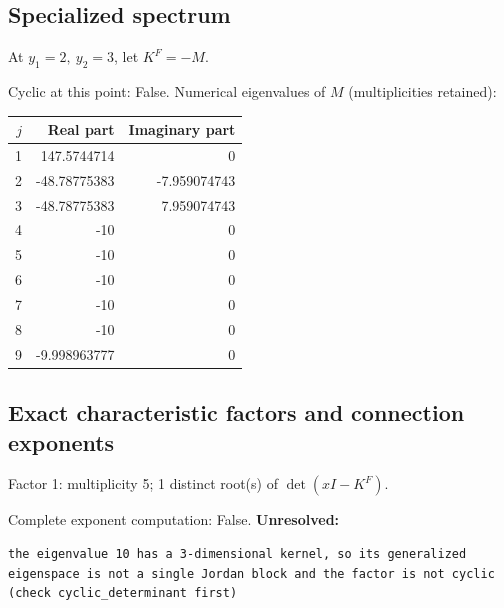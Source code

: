 \documentclass[10pt,a4paper]{article}
\newcommand{\fitmath}[1]{\sbox{\mathbox}{$\displaystyle #1$}\ifdim\wd\mathbox>\linewidth\resizebox{\linewidth}{!}{\usebox{\mathbox}}\else\usebox{\mathbox}\fi}
\begin{document}
\subsection*{Specialized spectrum}
At $y_1=2,\ y_2=3$, let $K^F=-M$.
\begin{center}\fitmath{\Delta=0}\end{center}
Cyclic at this point: False.
Numerical eigenvalues of $M$ (multiplicities retained):
\begin{center}\small\begin{tabular}{rrr}\toprule $j$ & Real part & Imaginary part\\\midrule
1 & 147.5744714 & 0\\
2 & -48.78775383 & -7.959074743\\
3 & -48.78775383 & 7.959074743\\
4 & -10 & 0\\
5 & -10 & 0\\
6 & -10 & 0\\
7 & -10 & 0\\
8 & -10 & 0\\
9 & -9.998963777 & 0\\
\bottomrule\end{tabular}\end{center}
\subsection*{Exact characteristic factors and connection exponents}
Factor 1: multiplicity 5; 1 distinct root(s) of $\det(xI-K^F)$.
\begin{center}\fitmath{\begin{aligned}p_{1}(x)&=x - 10\end{aligned}}\end{center}
Complete exponent computation: False.
\textbf{Unresolved:}

\begin{lstlisting}
the eigenvalue 10 has a 3-dimensional kernel, so its generalized eigenspace is not a single Jordan block and the factor is not cyclic (check cyclic_determinant first)
\end{lstlisting}
\end{document}
